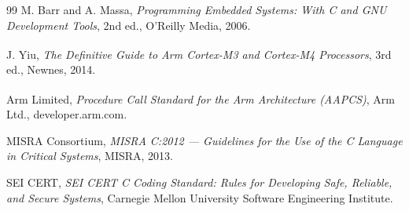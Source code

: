 \begin{thebibliography}{99}
M. Barr and A. Massa, \emph{Programming Embedded Systems: With C and GNU Development Tools}, 2nd ed., O'Reilly Media, 2006.

J. Yiu, \emph{The Definitive Guide to Arm\textsuperscript{\textregistered} Cortex\textsuperscript{\textregistered}-M3 and Cortex-M4 Processors}, 3rd ed., Newnes, 2014.

Arm Limited, \emph{Procedure Call Standard for the Arm\textsuperscript{\textregistered} Architecture (AAPCS)}, Arm Ltd., developer.arm.com.

MISRA Consortium, \emph{MISRA C:2012 --- Guidelines for the Use of the C Language in Critical Systems}, MISRA, 2013.

SEI CERT, \emph{SEI CERT C Coding Standard: Rules for Developing Safe, Reliable, and Secure Systems}, Carnegie Mellon University Software Engineering Institute.

\end{thebibliography}
